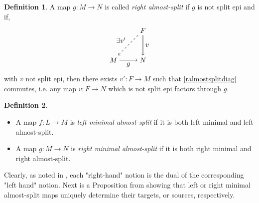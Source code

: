\documentclass[11.5pt, twoside, a4paper, titlepage]{report}
\theoremstyle{definition}
\newtheorem{mydef}{Definition}[section]
\theoremstyle{plain}
\begin{document}
\begin{mydef}
A map $g: M \to N$ is called \emph{right almost-split} if $g$ is not split epi and if,
\begin{equation} \label{ralmostsplitdiag}
\begin{tikzpicture}[->,-latex, auto, main path/.style={->, semithick}, main node/.style={}]
\node	[main node]		(1) at (0,0)		{$M$};
\node [main node]		(2) at (1.5,0)	{$N$};
\node [main node]		(3) at (1.5,1.5)	{$F$};

\draw (1) [main path] edge node [auto, swap] {$g$} (2);
\draw (3) [main path] edge node [auto] {$v$} (2);
\draw (3) [->, dashed, semithick] edge node [auto, swap] {$\exists v'$} (1);
\end{tikzpicture}
\end{equation}
with $v$ not split epi, then there exists $v': F \to M$ such that \ref{ralmostsplitdiag} commutes, i.e. any map $v: F \to N$ which is not split epi factors through $g$.
\end{mydef}

\begin{mydef}
\begin{itemize}
\item A map $f: L \to M$ is \emph{left minimal almost-split} if it is both left minimal and left almost-split.
\item A map $g: M \to N$ is \emph{right minimal almost-split} if it is both right minimal and right almost-split.
\end{itemize}
\end{mydef}

Clearly, as noted in \cite{Assem}, each "right-hand" notion is the dual of the corresponding "left hand" notion. Next is a Proposition from \cite{Assem} showing that left or right minimal almost-split maps uniquely determine their targets, or sources, respectively. 
\end{document}
